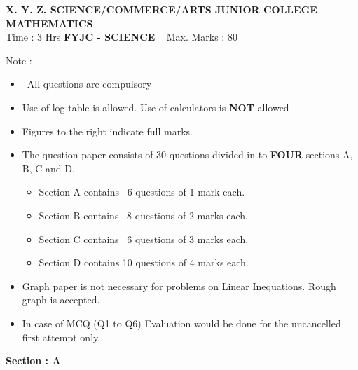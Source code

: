 \documentclass[12pt,a4paper]{article}
\begin{document}
\begin{center}
\textbf {X. Y. Z. SCIENCE/COMMERCE/ARTS JUNIOR COLLEGE } \\
\textbf{MATHEMATICS} \\

Time : 3 Hrs \hspace {3.6cm} \textbf {FYJC - SCIENCE}  \hspace{2.9cm} Max. Marks : 80

\end{center}

Note :

\begin {itemize}
\item  All questions are compulsory 

\item Use of log table is allowed. Use of calculators is \textbf{NOT} allowed

\item Figures to the right indicate full marks.

\item The question paper consists of 30 questions divided in to \textbf{FOUR} sections A, B, C and D. 

\begin {itemize}

\item Section A contains  6 questions of 1 mark each.

\item Section B contains  8 questions of 2 marks each.

\item Section C contains  6 questions of 3 marks each.

\item Section D contains 10 questions of 4 marks each.

\end{itemize}

\item Graph paper is not necessary for problems on Linear Inequations. Rough graph is accepted.

\item In case of MCQ (Q1 to Q6) Evaluation would be done for the uncancelled first attempt only. 

\end{itemize}


\begin{center}

\textbf {Section : A}

\end{center}
\end{document}
